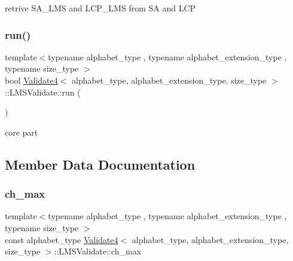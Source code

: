 retrive S\+A\+\_\+\+L\+MS and L\+C\+P\+\_\+\+L\+MS from SA and L\+CP 

\mbox{\label{struct_validate4_1_1_l_m_s_validate_ae154c8745df4a743f7f13dfbb6e0dd95}} 
\subsubsection{\texorpdfstring{run()}{run()}}
{\footnotesize\ttfamily template$<$typename alphabet\+\_\+type , typename alphabet\+\_\+extension\+\_\+type , typename size\+\_\+type $>$ \\
bool \hyperlink{class_validate4}{Validate4}$<$ alphabet\+\_\+type, alphabet\+\_\+extension\+\_\+type, size\+\_\+type $>$\+::L\+M\+S\+Validate\+::run (\begin{DoxyParamCaption}{ }\end{DoxyParamCaption})\hspace{0.3cm}{\ttfamily [inline]}}



core part 



\subsection{Member Data Documentation}
\mbox{\label{struct_validate4_1_1_l_m_s_validate_a3e640263256e534dcf3da45f50ef0645}} 
\subsubsection{\texorpdfstring{ch\+\_\+max}{ch\_max}}
{\footnotesize\ttfamily template$<$typename alphabet\+\_\+type , typename alphabet\+\_\+extension\+\_\+type , typename size\+\_\+type $>$ \\
const alphabet\+\_\+type \hyperlink{class_validate4}{Validate4}$<$ alphabet\+\_\+type, alphabet\+\_\+extension\+\_\+type, size\+\_\+type $>$\+::L\+M\+S\+Validate\+::ch\+\_\+max\hspace{0.3cm}{\ttfamily [private]}}



